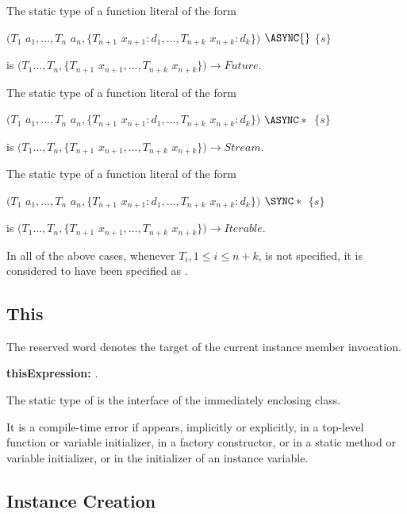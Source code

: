\documentclass{article}
\begin{document}
\LMHash{}
The static type of a function literal of the form  

$(T_1$ $a_1, \ldots, T_n$ $a_n, \{T_{n+1}$ $x_{n+1} : d_1, \ldots,  T_{n+k}$ $x_{n+k} : d_k\})$ $\ASYNC{}$ $\{s\}$
 
is $(T_1 \ldots, T_n, \{T_{n+1}$ $x_{n+1}, \ldots, T_{n+k}$ $x_{n+k}\}) \rightarrow  Future{}$.

\LMHash{}
The static type of a function literal of the form  

$(T_1$ $a_1, \ldots, T_n$ $a_n, \{T_{n+1}$ $x_{n+1} : d_1, \ldots,  T_{n+k}$ $x_{n+k} : d_k\})$ $\ASYNC*{}$ $\{s\}$
 
is $(T_1 \ldots, T_n, \{T_{n+1}$ $x_{n+1}, \ldots, T_{n+k}$ $x_{n+k}\}) \rightarrow  Stream{}$.

\LMHash{}
The static type of a function literal of the form  

$(T_1$ $a_1, \ldots, T_n$ $a_n, \{T_{n+1}$ $x_{n+1} : d_1, \ldots,  T_{n+k}$ $x_{n+k} : d_k\})$ $\SYNC*{}$ $\{s\}$
 
is $(T_1 \ldots, T_n, \{T_{n+1}$ $x_{n+1}, \ldots, T_{n+k}$ $x_{n+k}\}) \rightarrow  Iterable{}$.

\LMHash{}
In all of the above cases, whenever $T_i, 1 \le i \le n+k$, is not specified, it is considered to have been specified as  \DYNAMIC{}.


\subsection{ This}

\LMHash{}
The reserved word \THIS{} denotes the target of the current instance member invocation.

\begin{grammar}
{\bf thisExpression:}
      \THIS{}
     .
\end{grammar}

\LMHash{}
The static type of \THIS{} is the interface of the immediately enclosing class.


\LMHash{}
It is a compile-time error if \THIS{} appears, implicitly or explicitly,  in a top-level function or variable initializer,  in a factory constructor, or in a static method or variable initializer, or in the initializer of an instance variable. 

\subsection{ Instance Creation}
\end{document}
